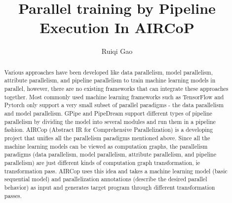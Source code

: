 \documentclass[sigplan]{acmart}\settopmatter{printfolios=true,printccs=false,printacmref=false}
\begin{document}
\sloppy

\title{Parallel training by Pipeline Execution In AIRCoP}

\author{Ruiqi Gao}

\begin{abstract}
  Various approaches have been developed like data parallelism, model parallelism, attribute parallelism, and pipeline parallelism to train machine learning models in parallel, however, there are no existing frameworks that can integrate these approaches together. Most commonly used machine learning frameworks such as TensorFlow and Pytorch only support a very small subset of parallel paradigms - the data parallelism and model parallelism. GPipe and PipeDream support different types of pipeline parallelism by dividing the model into several modules and run them in a pipeline fashion.
  AIRCop (Abstract IR for Comprehensive Parallelization) is a developing project that unifies all the parallelism paradigms mentioned above. Since all the machine learning models can be viewed as computation graphs, the parallelism paradigms (data parallelism, model parallelism, attribute parallelism, and pipeline parallelism) are just different kinds of computation graph transformation, ie transformation pass. AIRCop uses this idea and takes a machine learning model (basic sequential model) and parallelization annotations (describe the desired parallel behavior) as input and generates target program through different transformation passes.

\end{abstract}


\maketitle
\end{document}
